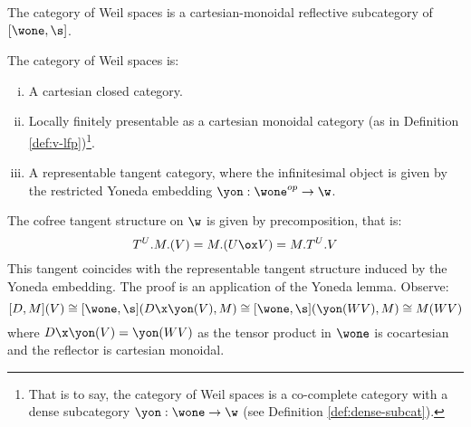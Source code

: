 \begin{proposition}
	The category of Weil spaces is a cartesian-monoidal reflective subcategory of $[\wone,\s]$.
\end{proposition}
\begin{corollary}
	The category of Weil spaces is:
	\begin{enumerate}[(i)]
		\item A cartesian closed category.
		\item Locally finitely presentable as a cartesian monoidal category (as in Definition \ref{def:v-lfp})\footnote{
			      That is to say, the category of Weil spaces is a co-complete category with a dense subcategory $\yon:\wone \to \w$ (see Definition \ref{def:dense-subcat}).
		      }.
		\item A representable tangent category, where the infinitesimal object is given by the restricted Yoneda embedding $\yon: \wone^{op} \to \w$.
	\end{enumerate}
\end{corollary}
The cofree tangent structure on $\w$ is given by precomposition, that is:
\[
	T^U.M.(V) = M.(U \ox V) = M.T^U.V
\]
This tangent coincides with the representable tangent structure induced by the Yoneda embedding. The proof is an application of the Yoneda lemma. Observe:
\[
	[D,M](V) \cong [\wone,\s](D \x \yon(V), M) \cong [\wone, \s](\yon(WV), M) \cong M(WV)
\]
where $D \x \yon(V) = \yon(WV)$ as the tensor product in $\wone$ is cocartesian and the reflector is cartesian monoidal.




